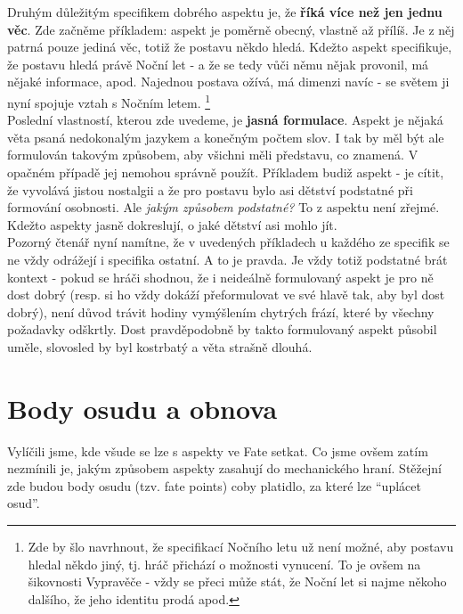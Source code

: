 Druhým důležitým specifikem dobrého aspektu je, že \textbf{říká více než jen jednu věc}. Zde začněme příkladem: aspekt  je poměrně obecný, vlastně až přílíš. Je z něj patrná pouze jediná věc, totiž že postavu někdo hledá. Kdežto aspekt  specifikuje, že postavu hledá právě Noční let - a že se tedy vůči němu nějak provonil, má nějaké informace, apod. Najednou postava ožívá, má dimenzi navíc - se světem ji nyní spojuje vztah s Nočním letem. \footnote{Zde by šlo navrhnout, že specifikací Nočního letu už není možné, aby postavu hledal někdo jiný, tj. hráč přichází o možnosti vynucení. To je ovšem na šikovnosti Vypravěče - vždy se přeci může stát, že Noční let si najme někoho dalšího, že jeho identitu prodá apod.}\\

Poslední vlastností, kterou zde uvedeme, je \textbf{jasná formulace}. Aspekt je nějaká věta psaná nedokonalým jazykem a konečným počtem slov. I tak by měl být ale formulován takovým způsobem, aby všichni měli představu, co znamená. V opačném případě jej nemohou správně použít. Příkladem budiž aspekt  - je cítit, že vyvolává jistou nostalgii a že pro postavu bylo asi dětství podstatné při formování osobnosti. Ale \textit{jakým způsobem podstatné?} To z aspektu není zřejmé. Kdežto aspekty  jasně dokreslují, o jaké dětství asi mohlo jít.\\

Pozorný čtenář nyní namítne, že v uvedených příkladech u každého ze specifik se ne vždy odrážejí i specifika ostatní. A to je pravda. Je vždy totiž podstatné brát kontext - pokud se hráči shodnou, že i neideálně formulovaný aspekt je pro ně dost dobrý (resp. si ho vždy dokáží přeformulovat ve své hlavě tak, aby byl dost dobrý), není důvod trávit hodiny vymýšlením chytrých frází, které by všechny požadavky odškrtly. Dost pravděpodobně by takto formulovaný aspekt působil uměle, slovosled by byl kostrbatý a věta strašně dlouhá.

\section{Body osudu a obnova}
\label{sec:body-osudu-obnova}

Vylíčili jsme, kde všude se lze s aspekty ve Fate setkat. Co jsme ovšem zatím nezmínili je, jakým způsobem aspekty zasahují do mechanického hraní. Stěžejní zde budou body osudu (tzv. fate points) coby platidlo, za které lze ``uplácet osud''. \\

